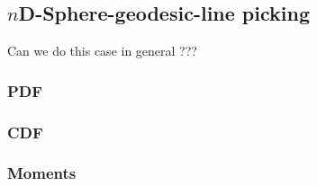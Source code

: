 \subsection{$n$D-Sphere-geodesic-line picking}
\label{sec:nsphere_geodesic_line}

Can we do this case in general ???

\subsubsection{PDF}


\subsubsection{CDF}


\subsubsection{Moments}



